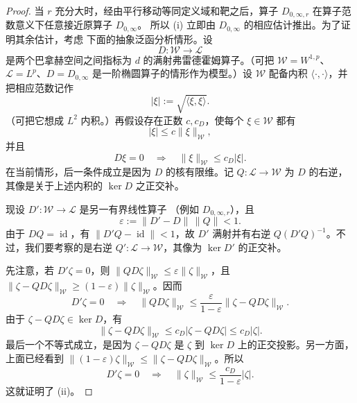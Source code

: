\begin{proof}
当 $r$ 充分大时，经由平行移动等同定义域和靶之后，算子
$D_{0,\infty,r}$ 在算子范数意义下任意接近原算子 $D_{0,\infty}$。
所以 (i) 立即由 $D_{0,\infty}$ 的相应估计推出。为了证明其余估计，考虑
下面的抽象泛函分析情形。设
\[
  D:\mathcal W\longrightarrow\mathcal L
\]
是两个巴拿赫空间之间指标为 $d$ 的满射弗雷德霍姆算子。（可把
$\mathcal W=W^{1,p}$、$\mathcal L=L^p$、$D=D_{0,\infty}$
是一阶椭圆算子的情形作为模型。）设 $\mathcal W$ 配备内积
$\langle\cdot,\cdot\rangle$，并把相应范数记作
\[
  |\xi|:=\sqrt{\langle\xi,\xi\rangle}.
\]
（可把它想成 $L^2$ 内积。）再假设存在正数 $c,c_D$，使每个
$\xi\in\mathcal W$ 都有
\begin{equation}\label{eq:10-6-1}
  |\xi|\le c\|\xi\|_{\mathcal W},
\end{equation}
并且
\begin{equation}\label{eq:10-6-2}
  D\xi=0\quad\Longrightarrow\quad
  \|\xi\|_{\mathcal W}\le c_D|\xi|.
\end{equation}
在当前情形，后一条件成立是因为 $D$ 的核有限维。记
$Q:\mathcal L\to\mathcal W$ 为
$D$ 的右逆，其像是关于上述内积的 $\ker D$ 之正交补。

现设 $D':\mathcal W\to\mathcal L$ 是另一有界线性算子
（例如 $D_{0,\infty,r}$），且
\[
  \varepsilon:=\|D'-D\|\,\|Q\|<1.
\]
由于 $DQ=\operatorname{id}$，有
$\|D'Q-\operatorname{id}\|<1$，故 $D'$ 满射并有右逆
$Q(D'Q)^{-1}$。不过，我们要考察的是右逆
$Q':\mathcal L\to\mathcal W$，其像为
$\ker D'$ 的正交补。

先注意，若 $D'\zeta=0$，则
$\|QD\zeta\|_{\mathcal W}\le\varepsilon\|\zeta\|_{\mathcal W}$，且
$\|\zeta-QD\zeta\|_{\mathcal W}
\ge(1-\varepsilon)\|\zeta\|_{\mathcal W}$。因而
\begin{equation}\label{eq:10-6-3}
  D'\zeta=0
  \quad\Longrightarrow\quad
  \|QD\zeta\|_{\mathcal W}
  \le\frac{\varepsilon}{1-\varepsilon}
      \|\zeta-QD\zeta\|_{\mathcal W}.
\end{equation}
由于 $\zeta-QD\zeta\in\ker D$，有
\[
  \|\zeta-QD\zeta\|_{\mathcal W}
  \le c_D|\zeta-QD\zeta|
  \le c_D|\zeta|.
\]
最后一个不等式成立，是因为 $\zeta-QD\zeta$ 是 $\zeta$ 到 $\ker D$
上的正交投影。另一方面，上面已经看到
$\|(1-\varepsilon)\zeta\|_{\mathcal W}
\le\|\zeta-QD\zeta\|_{\mathcal W}$。所以
\[
  D'\zeta=0
  \quad\Longrightarrow\quad
  \|\zeta\|_{\mathcal W}\le\frac{c_D}{1-\varepsilon}|\zeta|.
\]
这就证明了 (ii)。


\end{proof}
